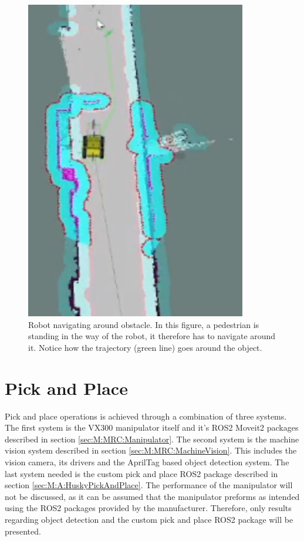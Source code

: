 \begin{figure}[ht]
\begin{minipage}[b]{0.49\textwidth}
    \includegraphics[width = 0.86\textwidth]{Figures/figUiaCollisionAvoid4.png}
    \caption{Robot navigating around obstacle. In this figure, a pedestrian is standing in the way of the robot, it therefore has to navigate around it. Notice how the trajectory (green line) goes around the object.}
    \label{fig:R&D:H:CA:collisionAvoidance2}
  \end{minipage}
\end{figure}


\section{Pick and Place} \label{R&D:PickAndPlace}
Pick and place operations is achieved through a combination of three systems. The first system is the VX300 manipulator itself and it's ROS2 Moveit2 packages described in section \ref{sec:M:MRC:Manipulator}. The second system is the machine vision system described in section \ref{sec:M:MRC:MachineVision}. This includes the vision camera, its drivers and the AprilTag based object detection system. The last system needed is the custom pick and place ROS2 package described in section \ref{sec:M:A:HuskyPickAndPlace}. The performance of the manipulator will not be discussed, as it can be assumed that the manipulator preforms as intended using the ROS2 packages provided by the manufacturer. Therefore, only results regarding object detection and the custom pick and place ROS2 package will be presented.



